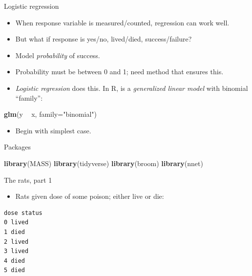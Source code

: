\documentclass[ignorenonframetext,]{beamer}
\newenvironment{Shaded}{\begin{snugshade}}{\end{snugshade}}
\newcommand{\DataTypeTok}[1]{\textcolor[rgb]{0.13,0.29,0.53}{#1}}
\newcommand{\KeywordTok}[1]{\textcolor[rgb]{0.13,0.29,0.53}{\textbf{#1}}}
\newcommand{\NormalTok}[1]{#1}
\newcommand{\OperatorTok}[1]{\textcolor[rgb]{0.81,0.36,0.00}{\textbf{#1}}}
\newcommand{\StringTok}[1]{\textcolor[rgb]{0.31,0.60,0.02}{#1}}
\providecommand{\tightlist}{%
  \setlength{\itemsep}{0pt}\setlength{\parskip}{0pt}}
\begin{document}
\begin{frame}[fragile]{Logistic regression}
\protect\hypertarget{logistic-regression}{}

\begin{itemize}
\item
  When response variable is measured/counted, regression can work well.
\item
  But what if response is yes/no, lived/died, success/failure?
\item
  Model \emph{probability} of success.
\item
  Probability must be between 0 and 1; need method that ensures this.
\item
  \emph{Logistic regression} does this. In R, is a \emph{generalized
  linear model} with binomial ``family'':
\end{itemize}

\begin{Shaded}
\begin{Highlighting}[]
\KeywordTok{glm}\NormalTok{(y }\OperatorTok{~}\StringTok{ }\NormalTok{x, }\DataTypeTok{family=}\StringTok{"binomial"}\NormalTok{)}
\end{Highlighting}
\end{Shaded}

\begin{itemize}
\tightlist
\item
  Begin with simplest case.
\end{itemize}

\end{frame}

\begin{frame}[fragile]{Packages}
\protect\hypertarget{packages-1}{}

\begin{Shaded}
\begin{Highlighting}[]
\KeywordTok{library}\NormalTok{(MASS)}
\KeywordTok{library}\NormalTok{(tidyverse)}
\KeywordTok{library}\NormalTok{(broom)}
\KeywordTok{library}\NormalTok{(nnet)}
\end{Highlighting}
\end{Shaded}

\end{frame}

\begin{frame}[fragile]{The rats, part 1}
\protect\hypertarget{the-rats-part-1}{}

\begin{itemize}
\tightlist
\item
  Rats given dose of some poison; either live or die:
\end{itemize}

\small

\begin{verbatim}
dose status
0 lived
1 died
2 lived
3 lived
4 died
5 died
\end{verbatim}

\normalsize

\end{frame}
\end{document}
